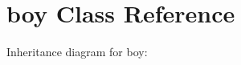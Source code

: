 \hypertarget{classboy}{}\section{boy Class Reference}
\label{classboy}


Inheritance diagram for boy\+:
